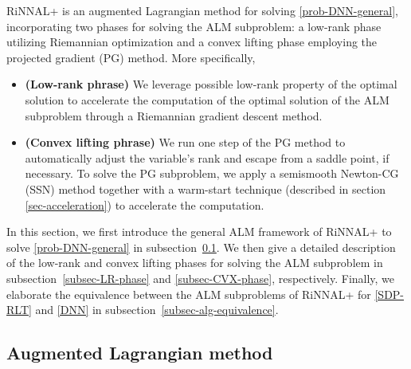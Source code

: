 \documentclass[11pt]{article}
\theoremstyle{plain}
\def\tb#1{\textbf{#1}}
\begin{document}
RiNNAL+ is an augmented Lagrangian method for solving \eqref{prob-DNN-general}, incorporating two phases for solving the ALM subproblem: a low-rank phase utilizing Riemannian optimization and a convex lifting phase employing the projected gradient (PG) method. More specifically,
\begin{itemize}
    \item \tb{(Low-rank phrase)} We leverage possible low-rank property of the 
    optimal solution  to accelerate the computation of the optimal solution of the ALM subproblem
    through a Riemannian gradient descent method.
    
    \item \tb{(Convex lifting phrase)} We run one step of the PG method 
    to automatically adjust the variable's rank and escape from a saddle point, if necessary.
    To solve the PG subproblem, we apply a semismooth Newton-CG (SSN) method 
    together with a warm-start technique (described in
    section \ref{sec-acceleration}) to accelerate
    the computation.
\end{itemize}

In this section, we first introduce the general ALM framework of RiNNAL+ to solve \eqref{prob-DNN-general} in subsection~\ref{subsec-ALM}. We then give a detailed description of the low-rank and convex lifting phases for solving the ALM subproblem in subsection~\ref{subsec-LR-phase} and \ref{subsec-CVX-phase}, respectively. Finally, we elaborate the equivalence between the ALM subproblems of RiNNAL+ for \eqref{SDP-RLT} and \eqref{DNN} in subsection~\ref{subsec-alg-equivalence}.





\subsection{Augmented Lagrangian method}\label{subsec-ALM}
\end{document}
